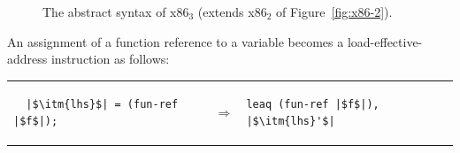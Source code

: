 \documentclass[11pt]{book}
\newcommand{\gray}[1]{{\color{gray} #1}}
\begin{document}
\begin{figure}[tp]
\fbox{
  \begin{minipage}{0.96\textwidth}
    \small
\[
\begin{array}{lcl}
  \Arg &::=&  \gray{  \INT{\Int} \mid \REG{\Reg} \mid \DEREF{\Reg}{\Int}
     \mid \BYTEREG{\Reg} } \\
     &\mid& \gray{ (\key{Global}~\Var) } \mid \FUNREF{\itm{label}} \\
  \Instr &::=& \ldots \mid \INDCALLQ{\itm{label}}{\itm{int}}
    \mid \TAILJMP{\Arg}{\itm{int}}\\
    &\mid& \BININSTR{\code{'leaq}}{\Arg}{\REG{\Reg}}\\
  \Def &::= & \DEF{\itm{label}}{([\Var\key{:}\Type]\ldots)}{\Type}{((\itm{label}\,\key{.}\,\Block)\ldots)} \\
x86_3 &::= & \PROGRAMDEFS{\itm{info}}{(\Def\ldots)}
\end{array}
\]
\end{minipage}
}
  \caption{The abstract syntax of x86$_3$ (extends x86$_2$ of Figure~\ref{fig:x86-2}).}
\label{fig:x86-3}
\end{figure}


An assignment of a function reference to a variable becomes a
load-effective-address instruction as follows: \\
\begin{tabular}{lcl}
\begin{minipage}{0.35\textwidth}
\begin{lstlisting}
  |$\itm{lhs}$| = (fun-ref |$f$|);
\end{lstlisting}
\end{minipage}
&
$\Rightarrow$\qquad\qquad
&
\begin{minipage}{0.3\textwidth}
\begin{lstlisting}
leaq (fun-ref |$f$|), |$\itm{lhs}'$|
\end{lstlisting}
\end{minipage}
\end{tabular} \\
\end{document}

